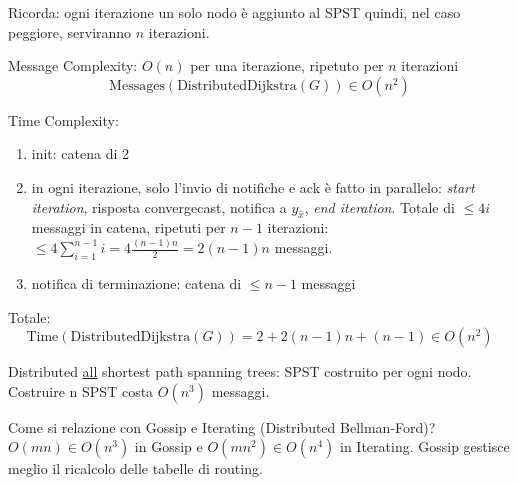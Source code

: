 Ricorda: ogni iterazione un solo nodo è aggiunto al SPST quindi, nel caso peggiore, serviranno $n$ iterazioni.

Message Complexity: $O(n)$ per una iterazione, ripetuto per $n$ iterazioni
$$
\text{Messages}(\text{DistributedDijkstra}(G)) \in O(n^2)
$$

Time Complexity:
\begin{enumerate}
  \item init: catena di 2
  \item in ogni iterazione, solo l'invio di notifiche e ack è fatto in parallelo: \textit{start iteration}, risposta convergecast, notifica a $y_{\hat x}$, \textit{end iteration}.
  Totale di $\leq 4i$ messaggi in catena, ripetuti per $n-1$ iterazioni: $\leq 4 \sum_{i=1}^{n-1} i = 4 \frac{(n-1)n}{2} = 2(n-1)n$ messaggi.
  \item notifica di terminazione: catena di $\leq n-1$ messaggi
\end{enumerate}

Totale:
$$
\text{Time}(\text{DistributedDijkstra}(G)) = 2 + 2(n-1)n + (n-1) \in O(n^2)
$$

Distributed \underline{all} shortest path spanning trees: SPST costruito per ogni nodo. Costruire n SPST costa $O(n^3)$ messaggi.

Come si relazione con Gossip e Iterating (Distributed Bellman-Ford)? $O(mn) \in O(n^3)$ in Gossip e $O(mn^2) \in O(n^4)$ in Iterating.
Gossip gestisce meglio il ricalcolo delle tabelle di routing.
